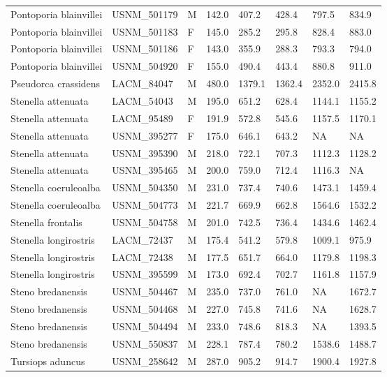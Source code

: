 \begin{longtable}{|p{1.95in}p{1.1in}p{.15in}p{.4in}p{.4in}p{.4in}p{.4in}p{.4in}|}
  Pontoporia blainvillei & USNM\_501179 & M & 142.0 & 407.2 & 428.4 & 797.5 & 834.9 \\ 
  Pontoporia blainvillei & USNM\_501183 & F & 145.0 & 285.2 & 295.8 & 828.4 & 883.0 \\ 
  Pontoporia blainvillei & USNM\_501186 & F & 143.0 & 355.9 & 288.3 & 793.3 & 794.0 \\ 
  Pontoporia blainvillei & USNM\_504920 & F & 155.0 & 490.4 & 443.4 & 880.8 & 911.0 \\ 
  Pseudorca crassidens & LACM\_84047 & M & 480.0 & 1379.1 & 1362.4 & 2352.0 & 2415.8 \\ 
  Stenella attenuata & LACM\_54043 & M & 195.0 & 651.2 & 628.4 & 1144.1 & 1155.2 \\ 
  Stenella attenuata & LACM\_95489 & F & 191.9 & 572.8 & 545.6 & 1157.5 & 1170.1 \\ 
  Stenella attenuata & USNM\_395277 & F & 175.0 & 646.1 & 643.2 & NA & NA  \\ 
  Stenella attenuata & USNM\_395390 & M & 218.0 & 722.1 & 707.3 & 1112.3 & 1128.2 \\ 
  Stenella attenuata & USNM\_395465 & M & 200.0 & 759.0 & 712.4 & 1116.3 & NA  \\ 
  Stenella coeruleoalba & USNM\_504350 & M & 231.0 & 737.4 & 740.6 & 1473.1 & 1459.4 \\ 
  Stenella coeruleoalba & USNM\_504773 & M & 221.7 & 669.9 & 662.8 & 1564.6 & 1532.2 \\ 
  Stenella frontalis & USNM\_504758 & M & 201.0 & 742.5 & 736.4 & 1434.6 & 1462.4 \\ 
  Stenella longirostris & LACM\_72437 & M & 175.4 & 541.2 & 579.8 & 1009.1 & 975.9 \\ 
  Stenella longirostris & LACM\_72438 & M & 177.5 & 651.7 & 664.0 & 1179.8 & 1198.3 \\ 
  Stenella longirostris & USNM\_395599 & M & 173.0 & 692.4 & 702.7 & 1161.8 & 1157.9 \\ 
  Steno bredanensis & USNM\_504467 & M & 235.0 & 737.0 & 761.0 & NA & 1672.7 \\ 
  Steno bredanensis & USNM\_504468 & M & 227.0 & 745.8 & 741.6 & NA & 1628.7 \\ 
  Steno bredanensis & USNM\_504494 & M & 233.0 & 748.6 & 818.3 & NA & 1393.5 \\ 
  Steno bredanensis & USNM\_550837 & M & 228.1 & 787.4 & 780.2 & 1538.6 & 1488.7 \\ 
  Tursiops aduncus & USNM\_258642 & M & 287.0 & 905.2 & 914.7 & 1900.4 & 1927.8 \\ 

\end{longtable}

